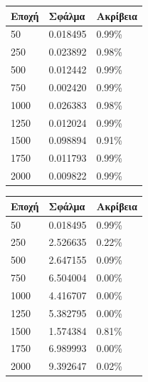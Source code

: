 \begin{center}
\begin{tabular}{|l|l|l|}
\hline
\textbf{Εποχή} & \textbf{Σφάλμα} & \textbf{Ακρίβεια} \\ \hline
50		   	   & 0.018495		 & 0.99\%            \\ \hline
250		       & 0.023892        & 0.98\%            \\ \hline
500  		   & 0.012442        & 0.99\%            \\ \hline
750	     	   & 0.002420        & 0.99\%            \\ \hline
1000		   & 0.026383        & 0.98\%            \\ \hline
1250		   & 0.012024        & 0.99\%            \\ \hline
1500		   & 0.098894        & 0.91\%            \\ \hline
1750		   & 0.011793        & 0.99\%            \\ \hline
2000		   & 0.009822        & 0.99\%            \\ \hline
\end{tabular}
\end{center}
 \label{tab:title}

\begin{center}
\begin{tabular}{|l|l|l|}
\hline
\textbf{Εποχή} & \textbf{Σφάλμα} & \textbf{Ακρίβεια} \\ \hline
50		   	   & 0.018495		 & 0.99\%            \\ \hline
250		       & 2.526635        & 0.22\%            \\ \hline
500  		   & 2.647155        & 0.09\%            \\ \hline
750	     	   & 6.504004        & 0.00\%            \\ \hline
1000		   & 4.416707        & 0.00\%            \\ \hline
1250		   & 5.382795        & 0.00\%            \\ \hline
1500		   & 1.574384        & 0.81\%            \\ \hline
1750		   & 6.989993        & 0.00\%            \\ \hline
2000		   & 9.392647        & 0.02\%            \\ \hline
\end{tabular}
\end{center}
 \label{tab:title}

